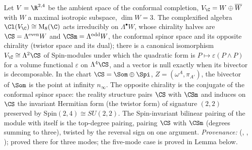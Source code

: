 Let $V = \R^{2,4}$ be the ambient space of the conformal completion, $V_{\C} = W \oplus \overline{W}$ with $W$ a maximal isotropic subspace, $\dim W = 3$. The complexified algebra $\Cl(V_{\C}) \cong \mathrm{M}_{8}(\C)$ acts irreducibly on $\Lambda^{\bullet}W$, whose chirality halves are $\CS = \Lambda^{\mathrm{even}}W$ and $\CSm = \Lambda^{\mathrm{odd}}W$, the conformal spinor space and its opposite chirality (twistor space and its dual); there is a canonical isomorphism $V_{\C} \cong \Lambda^{2}\CS$ of $\mathrm{Spin}$-modules under which the quadratic form is $P \mapsto \varepsilon(P \wedge P)$ for a volume functional $\varepsilon$ on $\Lambda^{4}\CS$, and a vector is null exactly when its bivector is decomposable. In the chart $\CS = \Som \oplus \Spi$, $Z = (\omega^{A}, \pi_{A'})$, the bivector of $\Som$ is the point at infinity $n_{\infty}$. The opposite chirality is the conjugate of the conformal spinor space: the reality structure pairs $\CS$ with $\CSm$ and induces on $\CS$ the invariant Hermitian form (the twistor form) of signature $(2,2)$ preserved by $\mathrm{Spin}(2,4) \cong SU(2,2)$. The $\mathrm{Spin}$-invariant bilinear pairing of the module with itself is the top-degree pairing, pairing $\CS$ with $\CSm$ (degrees summing to three), twisted by the reversal sign on one argument. \emph{Provenance:} \cite[Thms.~3.1, 3.4, Prop.~4.5]{ButlerT9} (, , ); proved there for three modes; the five-mode case is proved in Lemma  below.
